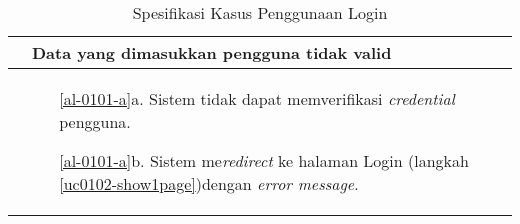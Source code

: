 \begin{table}[H]
\begin{tabular}{|r|p{8cm}|}
		\multicolumn{1}{|l|}{}                                           & \textbf{Data yang dimasukkan pengguna tidak valid}
		\\ \hline
		\multicolumn{1}{|l|}{}                                           & 
		\begin{itemize}
			\item[\ref{al-0101-a}a.] Sistem tidak dapat memverifikasi \textit{credential} pengguna.
			\item[\ref{al-0101-a}b.] Sistem me\textit{redirect} ke halaman Login (langkah \ref{uc0102-show1page})dengan \textit{error message}.
		\end{itemize}
		\\ \hline
	\end{tabular}
	\caption{Spesifikasi Kasus Penggunaan Login }
	\label{uc0102-tab}
\end{table}